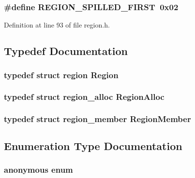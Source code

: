 \subsubsection{\setlength{\rightskip}{0pt plus 5cm}\#define REGION\_\-SPILLED\_\-FIRST~0x02}\label{region_8h_c307f4897b10ebd5a051af18ccf540c6}




Definition at line 93 of file region.h.

\subsection{Typedef Documentation}
\subsubsection{\setlength{\rightskip}{0pt plus 5cm}typedef struct \bf{region}
 \bf{Region}}\label{region_8h_f299fddfbc62aeb1c1f92bad6dc97fa5}


\subsubsection{\setlength{\rightskip}{0pt plus 5cm}typedef struct \bf{region\_\-alloc}
 \bf{Region\-Alloc}}\label{region_8h_db7631ec082fed563e87d59b59d463d8}


\subsubsection{\setlength{\rightskip}{0pt plus 5cm}typedef struct \bf{region\_\-member}
 \bf{Region\-Member}}\label{region_8h_f95575d4002b8799e3122f513a2f5013}




\subsection{Enumeration Type Documentation}
\subsubsection{\setlength{\rightskip}{0pt plus 5cm}anonymous enum}\label{region_8h_99fb83031ce9923c84392b4e92f956b5}


